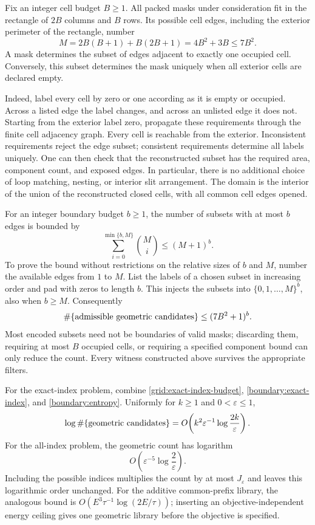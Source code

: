 \documentclass[11pt,reqno]{amsart}
\numberwithin{equation}{section}
\begin{document}
Fix an integer cell budget \(B\ge1\).  All packed masks under
consideration fit in the rectangle of \(2B\) columns and \(B\)
rows.  Its possible cell edges, including the exterior perimeter
of the rectangle, number
\[
 M=2B(B+1)+B(2B+1)=4B^2+3B\le7B^2.
\]
A mask determines the subset of edges adjacent to exactly one
occupied cell.  Conversely, this subset determines the mask
uniquely when all exterior cells are declared empty.

Indeed, label every cell by zero or one according as it is empty
or occupied.  Across a listed edge the label changes, and across
an unlisted edge it does not.  Starting from the exterior label
zero, propagate these requirements through the finite cell
adjacency graph.  Every cell is reachable from the exterior.
Inconsistent requirements reject the edge subset; consistent
requirements determine all labels uniquely.  One can then check
that the reconstructed subset has the required area, component
count, and exposed edges.  In particular, there is no additional
choice of loop matching, nesting, or interior slit arrangement.
The domain is the interior of the union of the reconstructed
closed cells, with all common cell edges opened.

For an integer boundary budget \(b\ge1\), the number of subsets
with at most \(b\) edges is bounded by
\[
 \sum_{i=0}^{\min\{b,M\}}\binom Mi\le(M+1)^b.
\]
To prove the bound without restrictions on the relative sizes
of \(b\) and \(M\), number the available edges from \(1\) to \(M\).
List the labels of a chosen subset in increasing order and pad
with zeros to length \(b\).  This injects the subsets into
\(\{0,1,\ldots,M\}^b\), also when \(b\ge M\).  Consequently
\begin{equation}
 \#\{\hbox{admissible geometric candidates}\}
 \le(7B^2+1)^b.
 \label{boundary:entropy}
\end{equation}
Most encoded subsets need not be boundaries of valid masks;
discarding them, requiring at most \(B\) occupied cells, or
requiring a specified component bound can only reduce the count.
Every witness constructed above survives the appropriate filters.

For the exact-index problem, combine
\eqref{grid:exact-index-budget}, \eqref{boundary:exact-index}, and
\eqref{boundary:entropy}.  Uniformly for \(k\ge1\) and
\(0<\varepsilon\le1\),
\begin{equation}
 \log\#\{\hbox{geometric candidates}\}
 =O\!\left(
    k^2\varepsilon^{-1}\log\frac{2k}{\varepsilon}
       \right).
 \label{boundary:exact-entropy}
\end{equation}
For the all-index problem, the geometric count has logarithm
\begin{equation}
 O\!\left(\varepsilon^{-5}
                   \log\frac2{\varepsilon}\right).
 \label{boundary:global-entropy}
\end{equation}
Including the possible indices multiplies the count by at most
\(J_\varepsilon\) and leaves this logarithmic order unchanged.
For the additive common-prefix library, the analogous bound is
\(O(E^3\tau^{-1}\log(2E/\tau))\); inserting an
objective-independent energy ceiling gives one geometric library
before the objective is specified.
\end{document}

